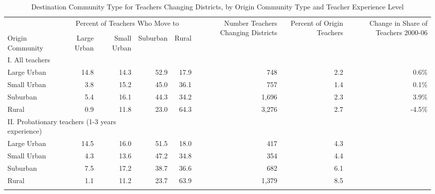 \documentclass[]{article}
\begin{document}
\begin{longtable}{lrrrrrrr}
  \hline
 & \multicolumn{4}{c}{\multirow{2}{*}{Percent of Teachers Who Move to}} & \multirow{4}{*}{\parbox{0.13\linewidth}{Number Teachers Changing Districts}} & \multirow{4}{*}{\parbox{0.12\linewidth}{Percent of Origin Teachers}} & \multirow{4}{*}{\parbox{0.16\linewidth}{Change in Share of Teachers 2000-06}}\\
 & \multicolumn{4}{c}{} & & & \\ \cline{2-5}
& & & & & & & \\
Origin Community & Large Urban & Small Urban & Suburban & Rural &  &  &  \\ 
  \hline
I. All teachers & & & & & & & \\
\quad Large Urban & 14.8 & 14.3 & 52.9 & 17.9 & 748 & 2.2 & 0.6\% \\ 
  \quad Small Urban & 3.8 & 15.2 & 45.0 & 36.1 & 757 & 1.4 & 0.1\% \\ 
  \quad Suburban & 5.4 & 16.1 & 44.3 & 34.2 & 1,696 & 2.3 & 3.9\% \\ 
  \quad Rural & 0.9 & 11.8 & 23.0 & 64.3 & 3,276 & 2.7 & -4.5\% \\ 
\multicolumn{3}{l}{II. Probationary teachers (1-3 years experience)} & & & & & \\
  \quad Large Urban & 14.5 & 16.0 & 51.5 & 18.0 & 417 & 4.3 &  \\ 
  \quad Small Urban & 4.3 & 13.6 & 47.2 & 34.8 & 354 & 4.4 &  \\ 
  \quad Suburban & 7.5 & 17.2 & 38.7 & 36.6 & 682 & 6.1 &  \\ 
  \quad Rural & 1.1 & 11.2 & 23.7 & 63.9 & 1,379 & 8.5 &  \\ 
   \hline
\caption{Destination Community Type for Teachers Changing Districts, by Origin Community Type and Teacher Experience Level} 
\label{tbl:markov}
\end{longtable}
\end{document}
